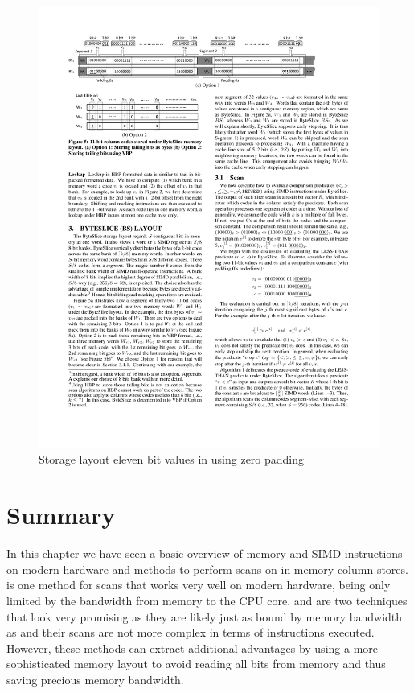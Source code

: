 \begin{figure}[h] \begin{center}
\includegraphics[scale=1]{images/bytesliceelevenbits}
\end{center}
\caption{Storage layout eleven bit values in \bs{} using zero padding~\cite{ByteSlice}}
\label{fig:bseleven}
\end{figure}

\section{Summary}

In this chapter we have seen a basic overview of memory and SIMD instructions on
modern hardware and methods to perform scans on in-memory column stores.
\simdscan{} is one method for scans that works very well on modern hardware,
being only limited by the bandwidth from memory to the CPU core. \bwv{} and
\bs{} are two techniques that look very promising as they are likely just as
bound by memory bandwidth as \simdscan{} and their scans are not more complex in
terms of instructions executed. However, these methods can extract additional
advantages by using a more sophisticated memory layout to avoid reading all bits
from memory and thus saving precious memory bandwidth.

